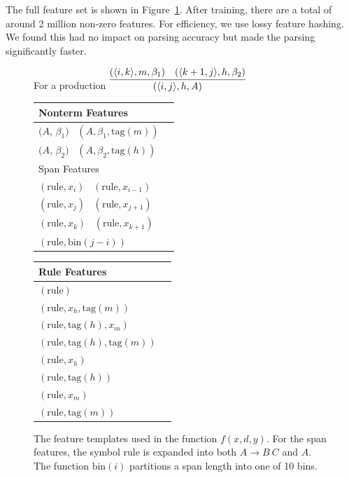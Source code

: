 \documentclass[11pt,letterpaper]{article}
\newcommand{\Span}[1]{\langle #1 \rangle}
\newcommand{\RuleSym}{\mathrm{rule}}
\newcommand{\Rule}[3]{#1 \rightarrow #2\ #3}
\newcommand{\BinFN}[1]{\mathrm{bin}({#1})}
\newcommand{\TagFN}[1]{\mathrm{tag}({#1})}
\newcommand{\WordFN}[1]{x_{#1}}
\begin{document}
The full feature set is shown in Figure~\ref{fig:features}.  After
training, there are a total of around 2 million non-zero features.
For efficiency, we use lossy feature hashing. We found this had no
impact on parsing accuracy but made the parsing significantly faster.


\begin{figure}
  \footnotesize
  \centering
  For a production $ \infer{(\Span{i, j}, h, A)}{(\Span{i, k}, m, \beta_1) &  (\Span{k+1, j}, h, \beta_2)} $

  \vspace{-0.1cm}

  \begin{multicols}{2}

  \begin{tabular}{|l|l}

  \hline
  Nonterm Features \\
  \hline

  \hline
  $(A$, $\beta_1)$ \  $(A, \beta_1, \TagFN{m})$  \\
  $(A$, $\beta_2)$ \  $(A, \beta_2, \TagFN{h})$ \\


  \hline
    \hline
  Span Features \\
  \hline

  \hline
  $(\RuleSym, \WordFN{i})$ \ $(\RuleSym, \WordFN{i-1})$\\
  $(\RuleSym, \WordFN{j})$ \  $(\RuleSym, \WordFN{j+1})$\\
  $(\RuleSym, \WordFN{k})$ \  $(\RuleSym, \WordFN{k+1})$\\
  $(\RuleSym, \BinFN{j-i})$\\
  \hline

  \end{tabular}

  \begin{tabular}{|l|l}

  \hline


  Rule Features \\
  \hline

  \hline

  $(\RuleSym  )$\\
  $(\RuleSym, \WordFN{h}, \TagFN{m})$ \\
  $(\RuleSym, \TagFN{h}, \WordFN{m})$ \\
  $(\RuleSym, \TagFN{h}, \TagFN{m})$ \\

  $(\RuleSym, \WordFN{h})$ \\
  $(\RuleSym, \TagFN{h})$ \\
  $(\RuleSym, \WordFN{m})$ \\
  $(\RuleSym, \TagFN{m})$ \\

  \hline

  \end{tabular}
  \end{multicols}

  \caption{The feature templates used in the function $f(x, d, y)$. For the span features, the symbol $\RuleSym$ is expanded into both $\Rule{A}{B}{C}$ and $A$. The function $\BinFN{i}$ partitions a span length into one of 10 bins.
   \label{fig:features} }
\end{figure}
\end{document}
